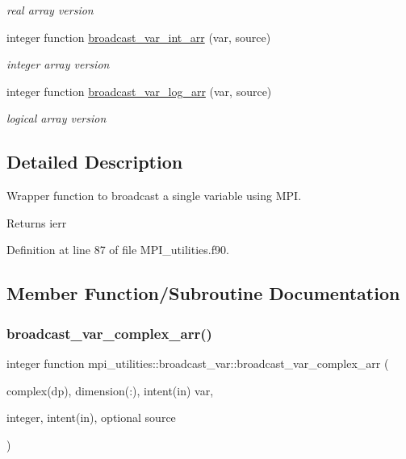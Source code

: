 \begin{DoxyCompactItemize}
\begin{DoxyCompactList}\small\item\em real array version \end{DoxyCompactList}\item 
integer function \hyperlink{interfacempi__utilities_1_1broadcast__var_ae139e28f73e24112a1925ba76933a201}{broadcast\+\_\+var\+\_\+int\+\_\+arr} (var, source)
\begin{DoxyCompactList}\small\item\em integer array version \end{DoxyCompactList}\item 
integer function \hyperlink{interfacempi__utilities_1_1broadcast__var_a058444a38b5d1993462500ca9a058376}{broadcast\+\_\+var\+\_\+log\+\_\+arr} (var, source)
\begin{DoxyCompactList}\small\item\em logical array version \end{DoxyCompactList}\end{DoxyCompactItemize}


\subsection{Detailed Description}
Wrapper function to broadcast a single variable using M\+PI. 

\begin{DoxyReturn}{Returns}
ierr 
\end{DoxyReturn}


Definition at line 87 of file M\+P\+I\+\_\+utilities.\+f90.



\subsection{Member Function/\+Subroutine Documentation}
\mbox{\label{interfacempi__utilities_1_1broadcast__var_aec408c072cf25bd06f02ff08fef359ef}} 
\subsubsection{\texorpdfstring{broadcast\+\_\+var\+\_\+complex\+\_\+arr()}{broadcast\_var\_complex\_arr()}}
{\footnotesize\ttfamily integer function mpi\+\_\+utilities\+::broadcast\+\_\+var\+::broadcast\+\_\+var\+\_\+complex\+\_\+arr (\begin{DoxyParamCaption}\item[{complex(dp), dimension(\+:), intent(in)}]{var,  }\item[{integer, intent(in), optional}]{source }\end{DoxyParamCaption})}



